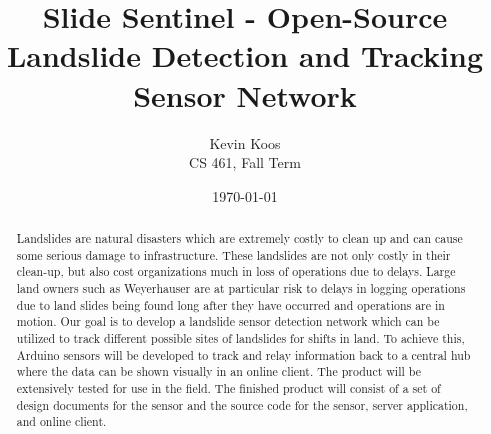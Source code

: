 \documentclass[draftclsnofoot,onecolumn, 10pt]{IEEEtran}
\author{Kevin Koos \\ CS 461, Fall Term}
\date{\today}
\title{Slide Sentinel - Open-Source Landslide Detection and Tracking Sensor Network}
\begin{document}
	\maketitle
	
	\begin{abstract}
		Landslides are natural disasters which are extremely costly to clean up and can cause some serious damage to infrastructure. These landslides are not only costly in their clean-up, but also cost organizations much in loss of operations due to delays. Large land owners such as Weyerhauser are at particular risk to delays in logging operations due to land slides being found long after they have occurred and operations are in motion. Our goal is to develop a landslide sensor detection network which can be utilized to track different possible sites of landslides for shifts in land. To achieve this, Arduino sensors will be developed to track and relay information back to a central hub where the data can be shown visually in an online client. The product will be extensively tested for use in the field. The finished product will consist of a set of design documents for the sensor and the source code for the sensor, server application, and online client.
		
		
	\end{abstract}
\end{document}
